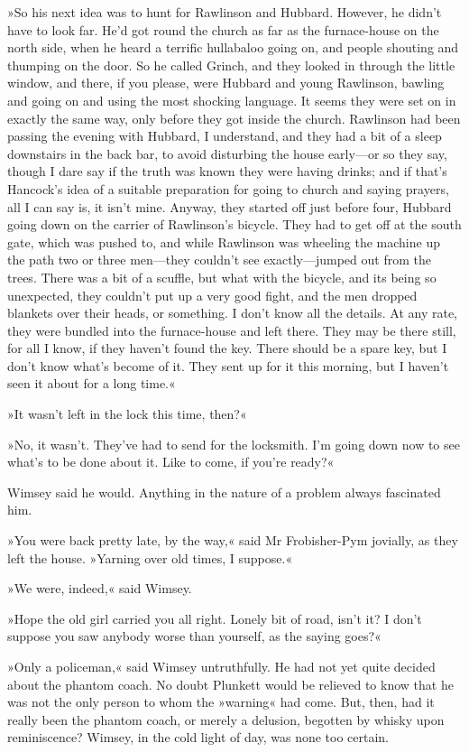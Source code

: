 »So his next idea was to hunt for Rawlinson and Hubbard. However, he didn't have to look far. He'd got round the church as far as the furnace-house on the north side, when he heard a terrific hullabaloo going on, and people shouting and thumping on the door. So he called Grinch, and they looked in through the little window, and there, if you please, were Hubbard and young Rawlinson, bawling and going on and using the most shocking language. It seems they were set on in exactly the same way, only before they got inside the church. Rawlinson had been passing the evening with Hubbard, I understand, and they had a bit of a sleep downstairs in the back bar, to avoid disturbing the house early—or so they say, though I dare say if the truth was known they were having drinks; and if that's Hancock's idea of a suitable preparation for going to church and saying prayers, all I can say is, it isn't mine. Anyway, they started off just before four, Hubbard going down on the carrier of Rawlinson's bicycle. They had to get off at the south gate, which was pushed to, and while Rawlinson was wheeling the machine up the path two or three men—they couldn't see exactly—jumped out from the trees. There was a bit of a scuffle, but what with the bicycle, and its being so unexpected, they couldn't put up a very good fight, and the men dropped blankets over their heads, or something. I don't know all the details. At any rate, they were bundled into the furnace-house and left there. They may be there still, for all I know, if they haven't found the key. There should be a spare key, but I don't know what's become of it. They sent up for it this morning, but I haven't seen it about for a long time.«

»It wasn't left in the lock this time, then?«

»No, it wasn't. They've had to send for the locksmith. I'm going down now to see what's to be done about it. Like to come, if you're ready?«

Wimsey said he would. Anything in the nature of a problem always fascinated him.

»You were back pretty late, by the way,« said Mr Frobisher-Pym jovially, as they left the house. »Yarning over old times, I suppose.«

»We were, indeed,« said Wimsey.

»Hope the old girl carried you all right. Lonely bit of road, isn't it? I don't suppose you saw anybody worse than yourself, as the saying goes?«

»Only a policeman,« said Wimsey untruthfully. He had not yet quite decided about the phantom coach. No doubt Plunkett would be relieved to know that he was not the only person to whom the »warning« had come. But, then, had it really been the phantom coach, or merely a delusion, begotten by whisky upon reminiscence? Wimsey, in the cold light of day, was none too certain.


